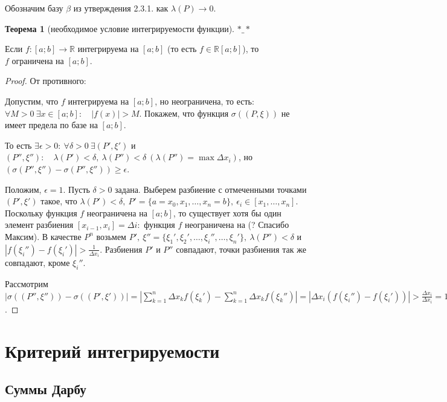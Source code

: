 \documentclass{report}
\theoremstyle{definition}
\newtheorem{theorem}{Теорема}[section]
\begin{document}
Обозначим базу $\beta$ из утверждения 2.3.1. как $\lambda(P)\rightarrow0$.

\begin{theorem}[необходимое условие интегрируемости функции]
  $*\_*$

  Если $f:[a;b]\rightarrow\mathbb{R}$ интегрируема на $[a;b]$ (то есть $f\in\mathbb{R}[a;b]$), то \\ $f$
  ограничена на $[a;b]$.
\end{theorem}

\begin{proof}
  От противного:

  Допустим, что $f$ интегрируема на $[a;b]$, но неограничена, то есть: $\forall M>0 \ \exists x \in
    [a;b]: \quad | f(x) | > M$. Покажем, что функция $\sigma ((P,\xi))$ не имеет предела по базе на $[a;b]$.

  То есть $\exists \epsilon > 0: \ \forall \delta > 0 \ \exists (P',\xi')$ и $(P'',\xi''): \quad
    \lambda(P') < \delta, \ \lambda(P'')<\delta \ (\lambda(P'') = \max\Delta x_{i})$, но
  $(\sigma(P'',\xi'') - \sigma(P'',\xi'')) \geqslant \epsilon$.

  Положим, $\epsilon = 1$. Пусть $\delta > 0$ задана. Выберем разбиение с отмеченными точками $(P',\xi')$
  такое, что $\lambda(P')<\delta, \ P' = \{a = x_{0},x_{1},\ldots,x_{n}=b\}, \ \epsilon_{i} \in [x_{1},
    \ldots,x_{n}]$. Поскольку функция $f$ неограничена на $[a;b]$, то существует хотя бы один элемент
  разбиения $[x_{i-1},x_{i}] = \Delta i:$ функция $f$ неограничена на (? Спасибо Максим). В качестве
  $P^{n}$ возьмем $P', \ \xi'' = \{\xi_{1}',\xi_{2}',\ldots,\xi_{i}'',\ldots,\xi_{n}'\}, \
    \lambda(P'')<\delta$ и $|f(\xi_{i}'') - f(\xi_{i}')| > \frac{1}{\Delta x_{i}}$. Разбиения $P'$ и $P''$
  совпадают, точки разбиения так же совпадают, кроме $\xi_{i}''$.

  Рассмотрим $| \sigma((P'',\xi'')) - \sigma((P',\xi')) | = | \sum_{k=1}^{n}\Delta x_{k}f(\xi_{k}') -
    \sum_{k=1}^{n}\Delta x_{k}f(\xi_{k}'') | = | \Delta x_{i}(f(\xi_{i}'') - f(\xi_{i}')) | >
    \frac{\Delta x_{i}}{\Delta x_{i}} = 1 = \epsilon$.
\end{proof}

\section{Критерий интегрируемости}

\subsection{Суммы Дарбу}
\end{document}
